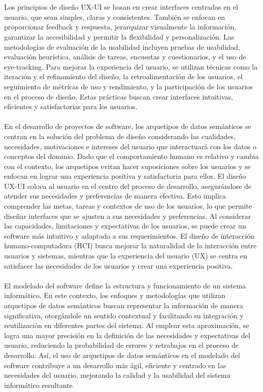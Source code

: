 \documentclass[12pt,a4paper]{article}
\begin{document}
\\\\
Los principios de diseño UX-UI se basan en crear interfaces centradas en el usuario, que sean simples, claras y consistentes. También se enfocan en proporcionar feedback y respuesta, jerarquizar visualmente la información, garantizar la accesibilidad y permitir la flexibilidad y personalización. Las metodologías de evaluación de la usabilidad incluyen pruebas de usabilidad, evaluación heurística, análisis de tareas, encuestas y cuestionarios, y el uso de eye-tracking. Para mejorar la experiencia del usuario, se utilizan técnicas como la iteración y el refinamiento del diseño, la retroalimentación de los usuarios, el seguimiento de métricas de uso y rendimiento, y la participación de los usuarios en el proceso de diseño. Estas prácticas buscan crear interfaces intuitivas, eficientes y satisfactorias para los usuarios.
\\\\
En el desarrollo de proyectos de software, los arquetipos de datos semánticos se centran en la solución del problema de diseño considerando las cualidades, necesidades, motivaciones e intereses del usuario que interactuará con los datos o conceptos del dominio. Dado que el comportamiento humano es relativo y cambia con el contexto, los arquetipos evitan hacer suposiciones sobre los usuarios y se enfocan en lograr una experiencia positiva y satisfactoria para ellos. El diseño UX-UI coloca al usuario en el centro del proceso de desarrollo, asegurándose de atender sus necesidades y preferencias de manera efectiva. Esto implica comprender las metas, tareas y contextos de uso de los usuarios, lo que permite diseñar interfaces que se ajusten a sus necesidades y preferencias. Al considerar las capacidades, limitaciones y expectativas de los usuarios, se puede crear un software más intuitivo y adaptado a sus requerimientos. El diseño de interacción humano-computadora (HCI) busca mejorar la naturalidad de la interacción entre usuarios y sistemas, mientras que la experiencia del usuario (UX) se centra en satisfacer las necesidades de los usuarios y crear una experiencia positiva. 
\\\\
El modelado del software define la estructura y funcionamiento de un sistema informático. En este contexto, los enfoques y metodologías que utilizan arquetipos de datos semánticos buscan representar la información de manera significativa, otorgándole un sentido contextual y facilitando su integración y reutilización en diferentes partes del sistema. Al emplear esta aproximación, se logra una mayor precisión en la definición de las necesidades y expectativas del usuario, reduciendo la probabilidad de errores y retrabajos en el proceso de desarrollo. Así, el uso de arquetipos de datos semánticos en el modelado del software contribuye a un desarrollo más ágil, eficiente y centrado en las necesidades del usuario, mejorando la calidad y la usabilidad del sistema informático resultante.
\end{document}
